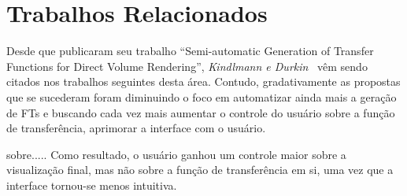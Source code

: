 
\chapter{Trabalhos Relacionados}
\label{related}
	Desde que publicaram seu trabalho ``Semi-automatic Generation of Transfer Functions for Direct Volume Rendering'', \textit{Kindlmann e Durkin}~\cite{1} vêm sendo citados nos trabalhos seguintes desta área. Contudo, gradativamente as  propostas que se sucederam foram diminuindo o foco em automatizar ainda mais a geração de FTs e buscando cada vez mais aumentar o controle do usuário sobre a função de transferência, aprimorar a interface com o usuário.

	 sobre..... Como resultado, o usuário ganhou um controle maior sobre a visualização final, mas não sobre a função de transferência em si, uma vez que a interface tornou-se menos intuitiva. 

